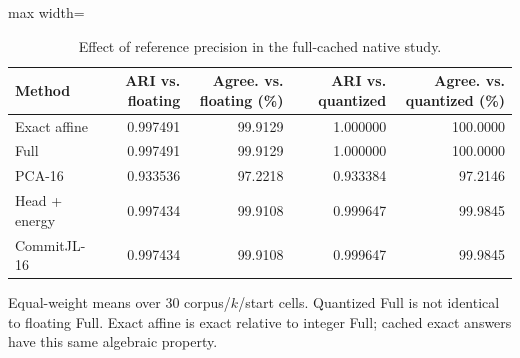 \begin{table}[tp]
\caption{Effect of reference precision in the full-cached native study.}\label{tab:references}
\centering\small
\begin{adjustbox}{max width=\textwidth}
\begin{tabular}{@{}lrrrr@{}}
\toprule
Method & ARI vs. floating & Agree. vs. floating (\%) & ARI vs. quantized & Agree. vs. quantized (\%) \\
\midrule
Exact affine & 0.997491 & 99.9129 & 1.000000 & 100.0000 \\
Full & 0.997491 & 99.9129 & 1.000000 & 100.0000 \\
PCA-16 & 0.933536 & 97.2218 & 0.933384 & 97.2146 \\
Head + energy & 0.997434 & 99.9108 & 0.999647 & 99.9845 \\
CommitJL-16 & 0.997434 & 99.9108 & 0.999647 & 99.9845 \\
\bottomrule
\end{tabular}
\end{adjustbox}
\par\vspace{3pt}\begin{minipage}{0.98\textwidth}\footnotesize Equal-weight means over 30 corpus/$k$/start cells. Quantized Full is not identical to floating Full. Exact affine is exact relative to integer Full; cached exact answers have this same algebraic property.\end{minipage}
\end{table}
